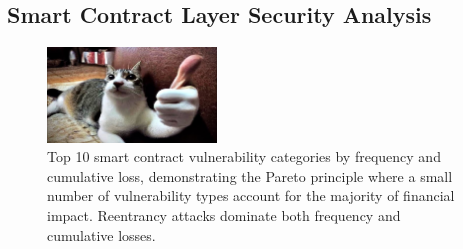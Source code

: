 \subsection{Smart Contract Layer Security Analysis}
\label{sec:results_smart_contract}


\begin{figure}[H]
\centering
\includegraphics[width=0.4\textwidth]{../figure/fig2.png}
\caption{Top 10 smart contract vulnerability categories by frequency and cumulative loss, demonstrating the Pareto principle where a small number of vulnerability types account for the majority of financial impact. Reentrancy attacks dominate both frequency and cumulative losses.}
\label{fig:smart_contract_pareto}
\end{figure}
